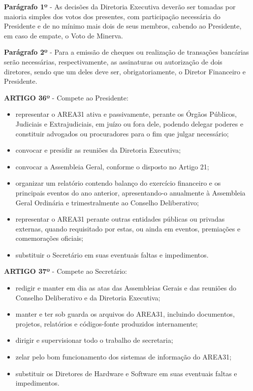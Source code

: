 \textbf{Parágrafo 1º} - As decisões da Diretoria Executiva deverão ser tomadas 
por maioria simples dos votos dos presentes, com participação necessária 
do Presidente e de no mínimo mais dois de seus membros, 
cabendo ao Presidente, em caso de empate, o Voto de Minerva.

\bigskip

\textbf{Parágrafo 2º} - Para a emissão de cheques ou realização de transações 
bancárias serão necessárias, respectivamente, as assinaturas ou autorização 
de dois diretores, sendo que um deles deve ser, obrigatoriamente, 
o  Diretor Financeiro e Presidente.

\bigskip

\textbf{ARTIGO 36º} - Compete ao Presidente:

\begin{itemize}
    \item representar o AREA31 ativa e passivamente, perante os Órgãos 
        Públicos, Judiciais e Extrajudiciais, em juízo ou fora dele, 
        podendo delegar poderes e constituir advogados ou procuradores 
        para o fim que julgar necessário;
    \item convocar e presidir as reuniões da Diretoria Executiva;
    \item convocar a Assembleia Geral, conforme o disposto no Artigo 21;
    \item organizar um relatório contendo balanço do exercício financeiro e 
        os principais eventos do ano anterior, apresentando-o anualmente à 
        Assembleia Geral Ordinária e trimestralmente ao Conselho Deliberativo;
    \item representar o AREA31 perante outras entidades públicas ou privadas 
        externas, quando requisitado por estas, ou ainda em eventos, 
        premiações e comemorações oficiais;
    \item substituir o Secretário em suas eventuais faltas e impedimentos.
\end{itemize}

\textbf{ARTIGO 37º} - Compete ao Secretário:

\begin{itemize}
    \item redigir e manter em dia as atas das Assembleias Gerais e das 
        reuniões do Conselho Deliberativo e da Diretoria Executiva;
    \item manter e ter sob guarda os arquivos do AREA31, incluindo documentos, 
        projetos, relatórios e códigos-fonte produzidos internamente;
    \item dirigir e supervisionar todo o trabalho de secretaria;
    \item zelar pelo bom funcionamento dos sistemas de informação do AREA31;
    \item substituir os Diretores de Hardware e Software em suas eventuais 
        faltas e impedimentos.
\end{itemize}

